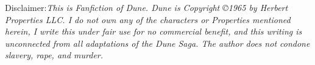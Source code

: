 Disclaimer:\textit{This is Fanfiction of Dune\cite{herbert_dune_2005}. Dune is Copyright \copyright 1965 by Herbert Properties LLC.
I do not own any of the characters or Properties mentioned herein, I write this under fair use for no commercial benefit, and this writing is unconnected from all adaptations of the Dune Saga.
The author does not condone slavery, rape, and murder.}
